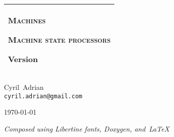 \documentclass[a4paper,twoside,10pt]{book}
\begin{document}
\hypersetup{pageanchor=false,citecolor=blue}
\begin{titlepage}
  \vspace*{3cm}
  \begin{center}
    \begin{tabular}{p{10cm}}
      \hline
      \begin{minipage}[t]{10cm}
        \begin{center}
          \vspace*{2ex}
          {\Huge\textsc{Machines}}

          \vspace*{1ex}
          {\Large\textsc{Machine state processors}}

          \vspace*{1ex}
          Version 
        \end{center}
      \end{minipage}
      \vspace{1ex}\\
      \hline
    \end{tabular}

    \vspace*{8em}
    {Cyril~{\sc Adrian} \\ \texttt{cyril.adrian@gmail.com}}

    \vspace*{2cm}
    \today

    \vfill
    \emph{\small Composed using Libertine fonts, Doxygen, and~\LaTeX~} \libertinelogo
  \end{center}
\end{titlepage}
\clearemptydoublepage
{}
\tableofcontents
\clearemptydoublepage
{}
\hypersetup{pageanchor=true,citecolor=blue}
\end{document}
